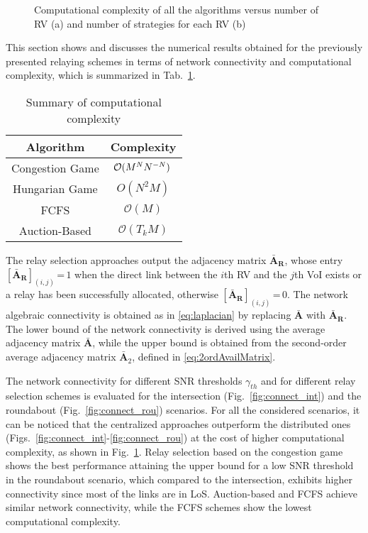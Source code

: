 \documentclass[journal]{IEEEtran}
\begin{document}
\begin{figure}[!t] 
\centering
{}

\caption{Computational complexity of all the algorithms versus number of RV (a) and number of strategies for each RV (b) }
\label{fig:complexity}
\end{figure}
This section shows and discusses the numerical results obtained for the previously presented relaying schemes in terms of network connectivity and computational complexity, which is summarized in Tab.~\ref{tab:complexity}.
\begin{table}[b] 
\centering 
\begin{tabular}{ | c | c | }
	\hline
	\textbf{Algorithm}  & \textbf{Complexity} \\ \hline\hline
	Congestion Game & $\hspace{-0.1cm} \mathcal{O}(M^{N}N^{-N})$ \\ 
	Hungarian Game & \hspace{-0.2cm} $ O(N^2M)$  \\ 
	FCFS & $\mathcal{O}(M)$  \\ 
	Auction-Based  & $\mathcal{O}(T_kM)$  \\ \hline\hline
	\end{tabular}
\caption{Summary of computational complexity}
\label{tab:complexity}
\end{table}
The relay selection approaches output the adjacency matrix $\mathbf{\bar{A}_{R}}$,
whose entry $\left[\mathbf{\bar{A}_R}\right]_{(i,j)}$\,=\,$1$ when the direct link between the $i$th RV and the $j$th VoI exists or a relay has been successfully allocated, otherwise $\left[\mathbf{\bar{A}_R}\right]_{(i,j)}$\,=\,$0$. The network algebraic connectivity is obtained as in \eqref{eq:laplacian} by replacing $\mathbf{\bar{A}}$ with $\mathbf{\bar{A}_{R}}$.
The lower bound of the network connectivity is derived using the average adjacency matrix $\mathbf{\bar{A}}$, while the upper bound is obtained from the second-order average adjacency matrix $\mathbf{\bar{A}}_2$, defined in \eqref{eq:2ordAvailMatrix}. 

The network connectivity for different SNR thresholds $\gamma_{th}$ and for different relay selection schemes is evaluated for the intersection (Fig.~\ref{fig:connect_int}) and the roundabout (Fig.~\ref{fig:connect_rou}) scenarios. For all the considered scenarios, it can be noticed that the centralized approaches outperform the distributed ones (Figs.~\ref{fig:connect_int}-\ref{fig:connect_rou}) at the cost of higher computational complexity, as shown in Fig.~\ref{fig:complexity}. Relay selection based on the congestion game shows the best performance attaining the upper bound for a low SNR threshold in the roundabout scenario, which compared to the intersection, exhibits higher connectivity since most of the links are in LoS. Auction-based and FCFS achieve similar network connectivity, while the FCFS schemes show the lowest computational complexity.
\end{document}
